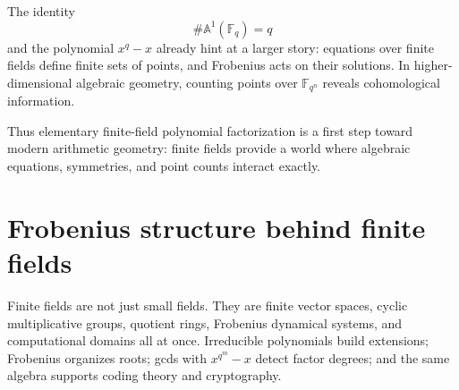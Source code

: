 The identity
\[
  \#\mathbb A^1(\mathbb F_q)=q
\]
and the polynomial \(x^q-x\) already hint at a larger story: equations over finite fields define finite sets of points, and Frobenius acts on their solutions.  In higher-dimensional algebraic geometry, counting points over \(\mathbb F_{q^n}\) reveals cohomological information.

Thus elementary finite-field polynomial factorization is a first step toward modern arithmetic geometry: finite fields provide a world where algebraic equations, symmetries, and point counts interact exactly.

\section{Frobenius structure behind finite fields}

Finite fields are not just small fields.  They are finite vector spaces, cyclic multiplicative groups, quotient rings, Frobenius dynamical systems, and computational domains all at once.  Irreducible polynomials build extensions; Frobenius organizes roots; gcds with \(x^{q^m}-x\) detect factor degrees; and the same algebra supports coding theory and cryptography.
